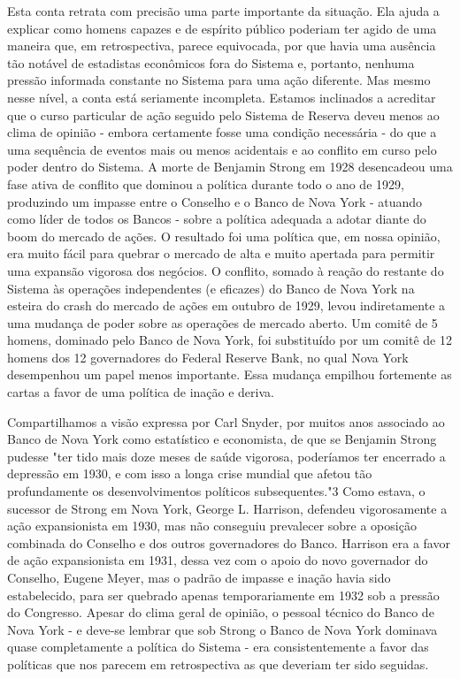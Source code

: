 \documentclass[a4paper,12pt]{article}[abntex2]
\begin{document}
Esta conta retrata com precisão uma parte importante da situação. Ela ajuda a explicar como homens capazes e de espírito público poderiam ter agido de uma maneira que, em retrospectiva, parece equivocada, por que havia uma ausência tão notável de estadistas econômicos fora do Sistema e, portanto, nenhuma pressão informada constante no Sistema para uma ação diferente. Mas mesmo nesse nível, a conta está seriamente incompleta. Estamos inclinados a acreditar que o curso particular de ação seguido pelo Sistema de Reserva deveu menos ao clima de opinião - embora certamente fosse uma condição necessária - do que a uma sequência de eventos mais ou menos acidentais e ao conflito em curso pelo poder dentro do Sistema. A morte de Benjamin Strong em 1928 desencadeou uma fase ativa de conflito que dominou a política durante todo o ano de 1929, produzindo um impasse entre o Conselho e o Banco de Nova York - atuando como líder de todos os Bancos - sobre a política adequada a adotar diante do boom do mercado de ações. O resultado foi uma política que, em nossa opinião, era muito fácil para quebrar o mercado de alta e muito apertada para permitir uma expansão vigorosa dos negócios. O conflito, somado à reação do restante do Sistema às operações independentes (e eficazes) do Banco de Nova York na esteira do crash do mercado de ações em outubro de 1929, levou indiretamente a uma mudança de poder sobre as operações de mercado aberto. Um comitê de 5 homens, dominado pelo Banco de Nova York, foi substituído por um comitê de 12 homens dos 12 governadores do Federal Reserve Bank, no qual Nova York desempenhou um papel menos importante. Essa mudança empilhou fortemente as cartas a favor de uma política de inação e deriva.

Compartilhamos a visão expressa por Carl Snyder, por muitos anos associado ao Banco de Nova York como estatístico e economista, de que se Benjamin Strong pudesse "ter tido mais doze meses de saúde vigorosa, poderíamos ter encerrado a depressão em 1930, e com isso a longa crise mundial que afetou tão profundamente os desenvolvimentos políticos subsequentes."3 Como estava, o sucessor de Strong em Nova York, George L. Harrison, defendeu vigorosamente a ação expansionista em 1930, mas não conseguiu prevalecer sobre a oposição combinada do Conselho e dos outros governadores do Banco. Harrison era a favor de ação expansionista em 1931, dessa vez com o apoio do novo governador do Conselho, Eugene Meyer, mas o padrão de impasse e inação havia sido estabelecido, para ser quebrado apenas temporariamente em 1932 sob a pressão do Congresso. Apesar do clima geral de opinião, o pessoal técnico do Banco de Nova York - e deve-se lembrar que sob Strong o Banco de Nova York dominava quase completamente a política do Sistema - era consistentemente a favor das políticas que nos parecem em retrospectiva as que deveriam ter sido seguidas.
\end{document}
